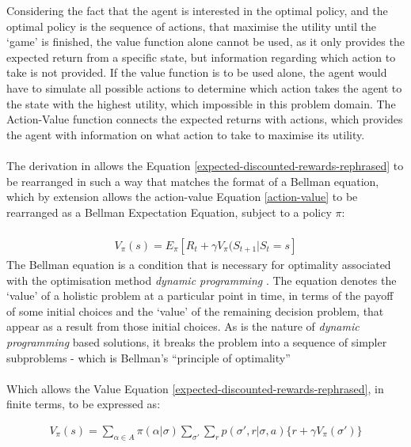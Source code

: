 \documentclass[ %
                    author={Ashwinder Khurana},
                supervisor={Prof Dave Cliff},
                    degree={MEng},
                     title={The Deeply Reinforced Trader},
                  subtitle={},
                      type={enterprise},
                      year={2020} ]{dissertation}
\begin{document}
{\noindent 
Considering the fact that the agent is interested in the optimal policy, and the optimal policy is the sequence of actions, that maximise the utility until the \enquote*{game} is finished, the value function alone cannot be used, as it only provides the expected return from a specific state, but information regarding which action to take is not provided. If the value function is to be used alone, the agent would have to simulate all possible actions to determine which action takes the agent to the state with the highest utility, which impossible in this problem domain. The Action-Value function connects the expected returns with actions, which provides the agent with information on what action to take to maximise its utility. 
\\
\\
The derivation in \cite{rearrange-value-function https://www.jeremyjordan.me/markov-decision-process} allows the Equation \ref{expected-discounted-rewards-rephrased} to be rearranged in such a way that matches the format of a Bellman equation, which by extension allows the action-value Equation \ref{action-value} to be rearranged as a Bellman Expectation Equation, subject to a policy $\pi$:
\\
\\
\begin{equation}
\label{bellman}
\begin{split}
V_\pi(s) = E_\pi[R_t + \gamma V_\pi(S_{t+1} | S_t = s]
\end{split}
\end{equation}
\noindent
The Bellman equation is a condition that is necessary for optimality associated with the optimisation method \textit{dynamic programming} \cite{https://bit.ly/31gZ7tR}. The equation denotes the \enquote*{value} of a holistic problem at a particular point in time, in terms of the payoff of some initial choices and the \enquote*{value} of the remaining decision problem, that appear as a result from those initial choices. As is the nature of \textit{dynamic programming} based solutions, it breaks the problem into a sequence of simpler subproblems - which is Bellman's \enquote{principle of optimality}\cite{https://bit.ly/3iY76ls}
\\
\\
\noindent
Which allows the Value Equation \ref{expected-discounted-rewards-rephrased}, in finite terms, to be expressed as:

\begin{equation}
\label{value-function-bellman}
\begin{split}
V_\pi(s) = \sum\limits^{}_{\alpha \in A}{\pi(\alpha | \sigma)} \sum\limits^{}_{\sigma'}{\sum\limits^{}_{r}{p(\sigma' , r | \sigma, a) \{r + \gamma V_\pi(\sigma')\}}}
\end{split}
\end{equation}

}
\end{document}
